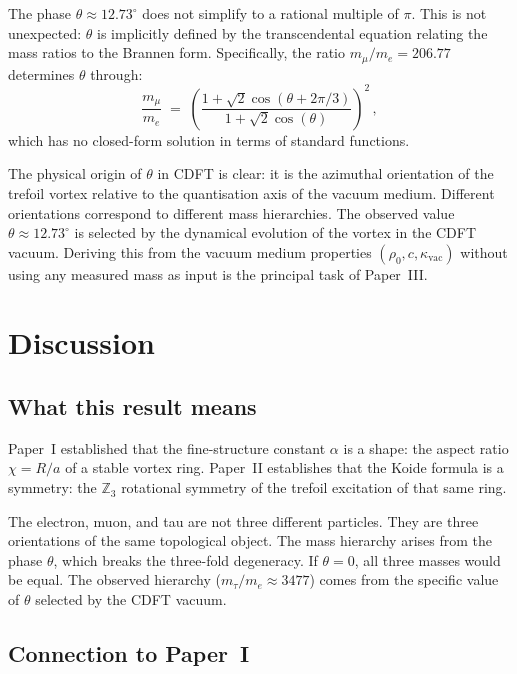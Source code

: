 \documentclass[11pt]{article}
\begin{document}
The phase $\theta \approx 12.73^\circ$ does not simplify to a rational multiple
of $\pi$.
This is not unexpected: $\theta$ is implicitly defined by the transcendental
equation relating the mass ratios to the Brannen form.
Specifically, the ratio $m_\mu/m_e = 206.77$ determines $\theta$ through:
\begin{equation}
  \frac{m_\mu}{m_e} \;=\;
  \left(\frac{1 + \sqrt{2}\cos(\theta + 2\pi/3)}
             {1 + \sqrt{2}\cos(\theta)}\right)^2\,,
  \label{eq:theta_implicit}
\end{equation}
which has no closed-form solution in terms of standard functions.

The physical origin of $\theta$ in CDFT is clear: it is the azimuthal orientation
of the trefoil vortex relative to the quantisation axis of the vacuum medium.
Different orientations correspond to different mass hierarchies.
The observed value $\theta \approx 12.73^\circ$ is selected by the dynamical
evolution of the vortex in the CDFT vacuum.
Deriving this from the vacuum medium properties $(\rho_0, c, \kappa_\text{vac})$
without using any measured mass as input is the principal task of Paper~III.


\section{Discussion}
\label{sec:discussion}

\subsection{What this result means}

Paper~I established that the fine-structure constant $\alpha$ is a shape:
the aspect ratio $\chi = R/a$ of a stable vortex ring.
Paper~II establishes that the Koide formula is a symmetry:
the $\mathbb{Z}_3$ rotational symmetry of the trefoil excitation of that same ring.

The electron, muon, and tau are not three different particles.
They are three orientations of the same topological object.
The mass hierarchy arises from the phase $\theta$, which breaks the three-fold
degeneracy.
If $\theta = 0$, all three masses would be equal.
The observed hierarchy ($m_\tau / m_e \approx 3477$) comes from the specific
value of $\theta$ selected by the CDFT vacuum.

\subsection{Connection to Paper~I}
\end{document}
